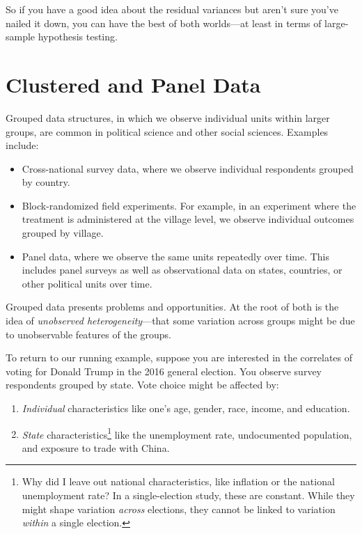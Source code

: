 \documentclass[
  12pt,
  oneside,openany]{book}
\begin{document}
So if you have a good idea about the residual variances but aren't sure you've nailed it down, you can have the best of both worlds---at least in terms of large-sample hypothesis testing.

\hypertarget{panel}{%
\chapter{Clustered and Panel Data}\label{panel}}

Grouped data structures, in which we observe individual units within larger groups, are common in political science and other social sciences. Examples include:

\begin{itemize}
\item
  Cross-national survey data, where we observe individual respondents grouped by country.
\item
  Block-randomized field experiments. For example, in an experiment where the treatment is administered at the village level, we observe individual outcomes grouped by village.
\item
  Panel data, where we observe the same units repeatedly over time. This includes panel surveys as well as observational data on states, countries, or other political units over time.
\end{itemize}

Grouped data presents problems and opportunities. At the root of both is the idea of \emph{unobserved heterogeneity}---that some variation across groups might be due to unobservable features of the groups.

To return to our running example, suppose you are interested in the correlates of voting for Donald Trump in the 2016 general election. You observe survey respondents grouped by state. Vote choice might be affected by:

\begin{enumerate}
\def\labelenumi{\arabic{enumi}.}
\item
  \emph{Individual} characteristics like one's age, gender, race, income, and education.
\item
  \emph{State} characteristics\footnote{Why did I leave out national characteristics, like inflation or the national unemployment rate? In a single-election study, these are constant. While they might shape variation \emph{across} elections, they cannot be linked to variation \emph{within} a single election.} like the unemployment rate, undocumented population, and exposure to trade with China.
\end{enumerate}
\end{document}
